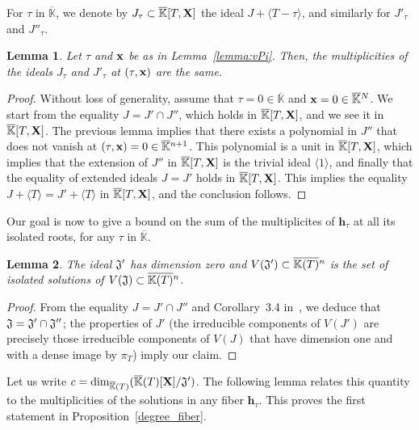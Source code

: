 \documentclass[11pt]{article}
\numberwithin{Property}{section}
\numberwithin{Theorem}{section}
\numberwithin{Proposition}{section}
\newtheorem{Lemma}{Lemma}%
\numberwithin{Lemma}{section}
\numberwithin{Corollary}{section}
\numberwithin{Definition}{section}
\numberwithin{Remark}{section}
\numberwithin{Conjecture}{section}
\numberwithin{Problem}{section}
\numberwithin{Claim}{section}
\theoremstyle{definition}
\numberwithin{Example}{section}
\def\h {\ensuremath{\mathbf{h}}}
\def\bar{\overline}
\newcommand{\field}{\mathbb{K}} %
\newcommand{\mat}[1]{\mathbf{\MakeUppercase{#1}}} %
\begin{document}
For $\tau$ in $\bar{\field}$, we denote by $J_\tau \subset \bar{\field}[T,\mat{X}]$ the ideal $J + \langle T-\tau \rangle$, and similarly for $J'_\tau$ and $ J''_\tau$.

\begin{Lemma}\label{lemma:JJprime}
  Let $\tau$ and ${\bf x}$ be as in Lemma~\ref{lemma:vPi}. Then, the
  multiplicities of the ideals $J_\tau$ and $J'_\tau$ at $(\tau,{\bf x})$
  are the same.
\end{Lemma}
\begin{proof}
  Without loss of generality, assume that $\tau=0 \in \bar{\field}$ and
  ${\bf x}=0 \in \bar{\field}{}^N$. We start from the equality $J=J' \cap J''$,
  which holds in $\bar{\field}[T, \mat{X}]$, and we see it in $\bar{\field}[T, \mat{X}]$.  The
  previous lemma implies that there exists a polynomial in $J''$ that
  does not vanish at $(\tau,{\bf x})=0 \in \bar{\field}{}^{n+1}$.  This polynomial
  is a unit in $\bar{\field}[T, \mat{X}]$, which implies that the extension of
  $J''$ in $\bar{\field}[T, \mat{X}]$ is the trivial ideal $\langle 1 \rangle$, and
  finally that the equality of extended ideals $J=J'$ holds in
  $\bar{\field}[T, \mat{X}]$. This implies the equality $J+\langle T \rangle
  =J'+\langle T \rangle $ in $\bar{\field}[T, \mat{X}]$, and the conclusion
  follows.
\end{proof}

Our goal is now to give a bound on the sum of the multiplicites of
$\h_\tau$ at all its isolated roots, for any $\tau$ in $\bar{\field}$.

\begin{Lemma}
  The ideal $\frak{J}'$ has dimension zero and $V(\frak{J}') \subset
  \overline{\field(T)}{}^n$ is the set of isolated solutions of
  $V(\frak{J}) \subset \overline{\field(T)}{}^n$.
\end{Lemma}
\begin{proof}
 From the equality $J=J' \cap J''$ and Corollary~3.4 in~\cite{AtMc},
 we deduce that $\frak{J}=\frak{J'} \cap \frak{J''}$; the properties
 of $J'$ (the irreducible components of $V(J')$ are precisely those
 irreducible components of $V(J)$ that have dimension one and with a
 dense image by $\pi_T$) imply our claim.
\end{proof}

Let us write $c=\dim_{\bar{\field}(T)}(\bar{\field}(T)[\mat{X}]/{\frak J}')$.  The
following lemma relates this quantity to the multiplicities of the
solutions in any fiber $\h_\tau$. This proves the first statement
in Proposition~\ref{degree_fiber}.
\end{document}
